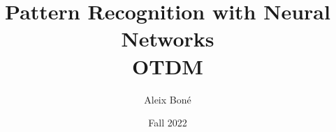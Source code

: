 




\makeatletter
\g@addto@macro\@floatboxreset\centering
\makeatother




\renewcommand\and{\\[\baselineskip]}

\title{\Huge Pattern Recognition with Neural Networks\\ \Large OTDM}
\author{Aleix Boné}
\date{Fall 2022}








